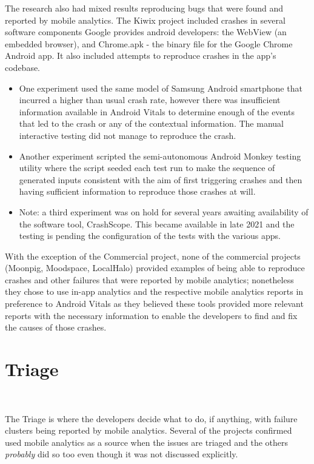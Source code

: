 The research also had mixed results reproducing bugs that were found and reported by mobile analytics.
%
The Kiwix project included crashes in several software components Google provides android developers: the WebView (an embedded browser), and Chrome.apk - the binary file for the Google Chrome Android app. It also included attempts to reproduce crashes in the app's codebase. 

\begin{itemize}
    \item One experiment used the same model of Samsung Android smartphone that incurred a higher than usual crash rate, however there was insufficient information available in Android Vitals to determine enough of the events that led to the crash or any of the contextual information. The manual interactive testing did not manage to reproduce the crash.
    \item Another experiment scripted the semi-autonomous Android Monkey testing utility where the script seeded each test run to make the sequence of generated inputs consistent with the aim of first triggering crashes and then having sufficient information to reproduce those crashes at will.
    \item Note: a third experiment was on hold for several years awaiting availability of the software tool, CrashScope. This became available in late 2021 and the testing is pending the configuration of the tests with the various apps.
\end{itemize}

With the exception of the Commercial project, none of the commercial projects (Moonpig, Moodspace, LocalHalo) provided examples of being able to reproduce crashes and other failures that were reported by mobile analytics; nonetheless they chose to use in-app analytics and the respective mobile analytics reports in preference to Android Vitals as they believed these tools provided more relevant reports with the necessary information to enable the developers to find and fix the causes of those crashes.

\section{Triage}~\label{aiu-triage-section}

The Triage is where the developers decide what to do, if anything, with failure clusters being reported by mobile analytics. Several of the projects confirmed used mobile analytics as a source when the issues are triaged and the others \textit{probably} did so too even though it was not discussed explicitly.

